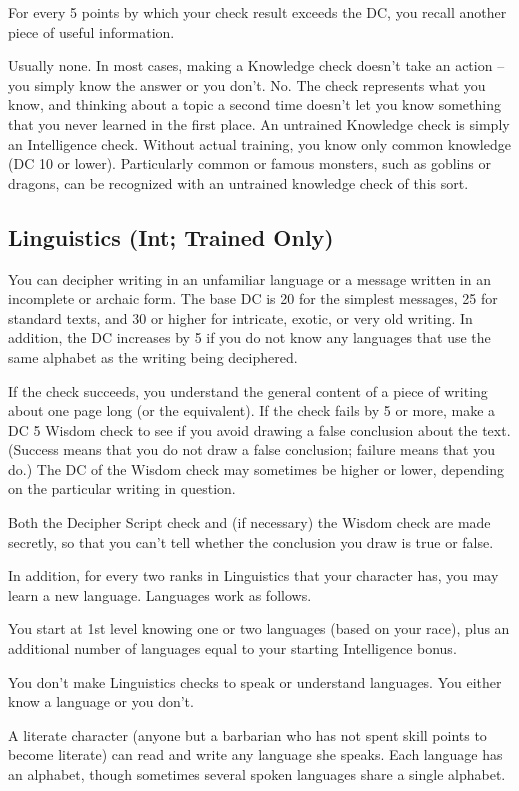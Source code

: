 For every 5 points by which your check result exceeds the DC, you recall another piece of useful information.

 Usually none. In most cases, making a Knowledge check doesn't take an action -- you simply know the answer or you don't.
 No. The check represents what you know, and thinking about a topic a second time doesn't let you know something that you never learned in the first place.
 An untrained Knowledge check is simply an Intelligence check. Without actual training, you know only common knowledge (DC 10 or lower). Particularly common or famous monsters, such as goblins or dragons, can be recognized with an untrained knowledge check of this sort.

\subsection{Linguistics (Int; Trained Only)}
 You can decipher writing in an unfamiliar language or a message written in an incomplete or archaic form. The base DC is 20 for the simplest messages, 25 for standard texts, and 30 or higher for intricate, exotic, or very old writing. In addition, the DC increases by 5 if you do not know any languages that use the same alphabet as the writing being deciphered.

If the check succeeds, you understand the general content of a piece of writing about one page long (or the equivalent). If the check fails by 5 or more, make a DC 5 Wisdom check to see if you avoid drawing a false conclusion about the text. (Success means that you do not draw a false conclusion; failure means that you do.) The DC of the Wisdom check may sometimes be higher or lower, depending on the particular writing in question.

Both the Decipher Script check and (if necessary) the Wisdom check are made secretly, so that you can't tell whether the conclusion you draw is true or false.

In addition, for every two ranks in Linguistics that your character has, you may learn a new language. Languages work as follows.
\begin{itemize*}
\item You start at 1st level knowing one or two languages (based on your race), plus an additional number of languages equal to your starting Intelligence bonus.
\item You don't make Linguistics checks to speak or understand languages. You either know a language or you don't.
\item A literate character (anyone but a barbarian who has not spent skill points to become literate) can read and write any language she speaks. Each language has an alphabet, though sometimes several spoken languages share a single alphabet.
\end{itemize*}

